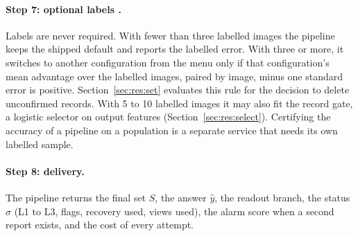 \paragraph{Step 7: optional labels .} Labels are never required. With fewer than three labelled images the pipeline keeps the shipped default and reports the labelled error. With three or more, it switches to another configuration from the menu only if that configuration's mean advantage over the labelled images, paired by image, minus one standard error is positive. Section~\ref{sec:res:set} evaluates this rule for the decision to delete unconfirmed records. With 5 to 10 labelled images it may also fit the record gate, a logistic selector on output features (Section~\ref{sec:res:select}). Certifying the accuracy of a pipeline on a population is a separate service that needs its own labelled sample.

\paragraph{Step 8: delivery.} The pipeline returns the final set $S$, the answer $\hat y$, the readout branch, the status $\sigma$ (L1 to L3, flags, recovery used, views used), the alarm score when a second report exists, and the cost of every attempt.


